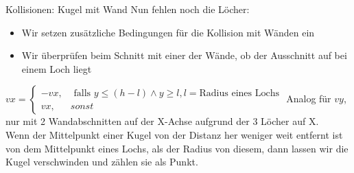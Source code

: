 \begin{frame}{Kollisionen: Kugel mit Wand}
Nun fehlen noch die Löcher: 
\begin{itemize}
	\item Wir setzen zusätzliche Bedingungen für die Kollision mit Wänden ein
	\item Wir überprüfen beim Schnitt mit einer der Wände, ob der Ausschnitt auf bei einem Loch liegt 	
\end{itemize}

$vx = \begin{cases}
-vx, & \text{ falls } y \leq (h- l) \land y \geq l, l = \text{Radius eines Lochs}\\
vx, & sonst 
\end{cases}$
Analog für $vy$, nur mit 2 Wandabschnitten auf der X-Achse aufgrund der 3 Löcher auf X. \\
Wenn der Mittelpunkt einer Kugel von der Distanz her weniger weit entfernt ist von dem Mittelpunkt eines Lochs, als der Radius von diesem, dann lassen wir die Kugel verschwinden und zählen sie als Punkt.

\end{frame}

